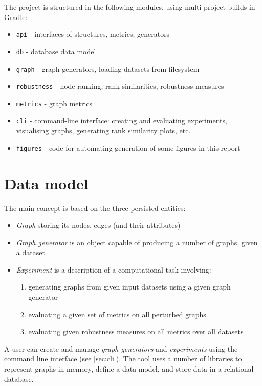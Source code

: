 The project is structured in the following modules, using multi-project builds in Gradle:
\begin{itemize}[itemsep=-2pt,topsep=5pt]
    \item \texttt{api} - interfaces of structures, metrics, generators
    \item \texttt{db} - database data model
    \item \texttt{graph} - graph generators, loading datasets from filesystem
    \item \texttt{robustness} - node ranking, rank similarities, robustness measures
    \item \texttt{metrics} - graph metrics
    \item \texttt{cli} - command-line interface: creating and evaluating experiments, visualising graphs, generating rank similarity plots, etc.
    \item \texttt{figures} - code for automating generation of some figures in this report
\end{itemize}


\section{Data model}

The main concept is based on the three persisted entities:
\begin{itemize}[topsep=5pt]
    \item \textsl{Graph} storing its nodes, edges (and their attributes)
    \item \textsl{Graph generator} is an object capable of producing a number of graphs, given a dataset.
    \item \textsl{Experiment} is a description of a computational task involving:
    \begin{enumerate}[topsep=0pt,itemsep=0pt]
        \item generating graphs from given input datasets using a given graph generator
        \item evaluating a given set of metrics on all perturbed graphs
        \item evaluating given robustness measures on all metrics over all datasets
    \end{enumerate}
\end{itemize}

A user can create and manage \textsl{graph generators} and \textsl{experiments} using the command line interface (see \autoref{sec:cli}).
The \graffs tool uses a number of libraries to represent graphs in memory, define a data model, and store data in a relational database.

